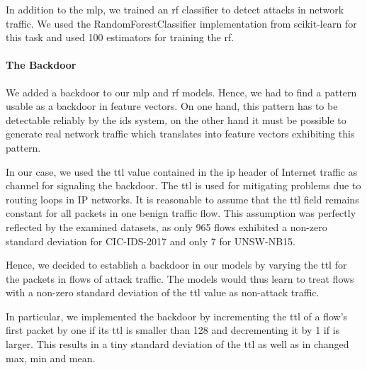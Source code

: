 \documentclass[10pt,sigconf,letterpaper,dvipsnames]{acmart}
\newcommand{\unsw}{UNSW-NB15}
\newcommand{\cic}{CIC-IDS-2017}
\begin{document}
In addition to the \gls{mlp}, we trained an \gls{rf} classifier to detect attacks in network traffic. We used the RandomForestClassifier implementation from scikit-learn for this task and used 100 estimators for training the \gls{rf}.

\paragraph{The Backdoor}

We added a backdoor to our \gls{mlp} and \gls{rf} models. %
Hence,
we
had to find a pattern usable as a backdoor in feature vectors. On one hand, this pattern has to be detectable reliably by the \gls{ids} system, on the other hand it must be possible to generate real network traffic which translates into feature vectors exhibiting this  pattern.

In our case, we used the \gls{ttl} value contained in the \gls{ip} header of Internet traffic
as channel for signaling the backdoor.
The \gls{ttl} is used for mitigating problems due to routing loops in IP networks.
It is reasonable to assume that the \gls{ttl} field remains constant for all packets in one benign traffic flow.
This assumption was perfectly reflected by the examined datasets, as only 965 flows exhibited a non-zero standard deviation for \cic{} and only 7 for \unsw{}.

Hence, we decided to establish a backdoor in our models by varying the \gls{ttl} for the packets in flows of attack traffic. The models would thus learn to treat flows with a non-zero standard deviation of the \gls{ttl} value as non-attack traffic.

In particular, we implemented the backdoor by incrementing the \gls{ttl} of a flow's first packet by one if its \gls{ttl} is smaller than 128 and decrementing it by 1 if is larger. This results in a tiny standard deviation of the \gls{ttl}
as well as in changed max, min and mean.
\end{document}

